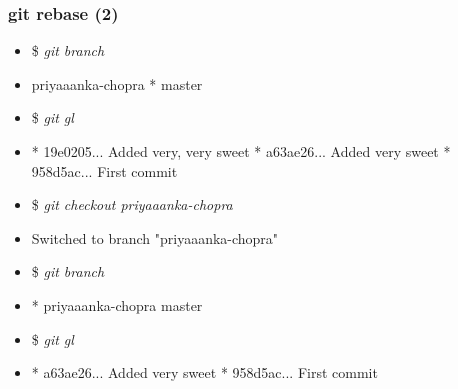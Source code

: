 \documentclass[10pt]{beamer}
\newcommand{\command}[1]{\textsl{\textit{#1}}}
\begin{document}
%
%

\begin{frame}[fragile]
\frametitle{git rebase (2)}

\begin{block}{}
\scriptsize
\begin{semiverbatim}
\begin{itemize}[<+-| alert@+>]
\item[]{\$ \command{git branch}}
\item[]{  priyaaanka-chopra
* master}

\item[]{\$ \command{git gl}}
\item[]{* 19e0205... Added very, very sweet 
* a63ae26... Added very sweet 
* 958d5ac... First commit}

\item[]{\$ \command{git checkout priyaaanka-chopra}}
\item[]{Switched to branch "priyaaanka-chopra"}

\item[]{\$ \command{git branch}}
\item[]{* priyaaanka-chopra
  master}

\item[]{\$ \command{git gl}}
\item[]{* a63ae26... Added very sweet
* 958d5ac... First commit}
\end{itemize}
\end{semiverbatim}
\end{block}

\end{frame}

%
%
\end{document}
